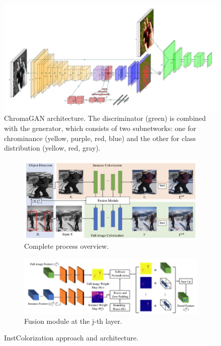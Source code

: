 \documentclass[10pt,twocolumn,letterpaper]{article}
\begin{document}
\begin{figure}[htbp]
	\centering
	\includegraphics[width=15cm]{diagram chr.jpg}
	\caption{ChromaGAN architecture. The discriminator (green) is combined with the generator, which consists of two subnetworks: one for chrominance (yellow, purple, red, blue) and the other for class distribution (yellow, red, gray).}
	\label{fig:chr}
\end{figure}

\begin{figure}[t]
	\centering
	
	\begin{subfigure}[b]{0.5\textwidth}
		\centering
		\begin{adjustwidth}{-2cm}{}
		\includegraphics[width=13cm]{diagram su1}
		\end{adjustwidth}
		\caption{Complete process overview.}
		\label{fig:su1}
	\end{subfigure}
	
	\begin{subfigure}[b]{0.5\textwidth}
		\centering
		\begin{adjustwidth}{-2cm}{}
			\includegraphics[width=13cm]{diagram su2}
		\end{adjustwidth}
		\caption{Fusion module at the j-th layer.}
		\label{fig:su2}
	\end{subfigure}

	\caption{{\small InstColorization approach and architecture.}}
\label{fig:su}
\end{figure}
\end{document}
